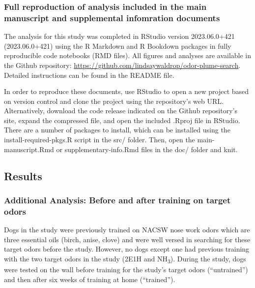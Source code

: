 \documentclass[
]{article}
\begin{document}
\hypertarget{full-reproduction-of-analysis-included-in-the-main-manuscript-and-supplemental-infomration-documents}{%
\subsubsection{Full reproduction of analysis included in the main manuscript and supplemental infomration documents}\label{full-reproduction-of-analysis-included-in-the-main-manuscript-and-supplemental-infomration-documents}}

The analysis for this study was completed in RStudio version 2023.06.0+421 (2023.06.0+421) using the R Markdown and R Bookdown packages in fully reproducible code notebooks (RMD files). All figures and analyses are available in the Github repository: \url{https://github.com/lindsaywaldrop/odor-plume-search}. Detailed instructions can be found in the README file.

In order to reproduce these documents, use RStudio to open a new project based on version control and clone the project using the repository's web URL. Alternatively, download the code release indicated on the Github repository's site, expand the compressed file, and open the included .Rproj file in RStudio. There are a number of packages to install, which can be installed using the install-required-pkgs.R script in the src/ folder. Then, open the main-manuscript.Rmd or supplementary-info.Rmd files in the doc/ folder and knit.

\hypertarget{results}{%
\subsection{Results}\label{results}}

\hypertarget{additional-analysis-before-and-after-training-on-target-odors}{%
\subsubsection{Additional Analysis: Before and after training on target odors}\label{additional-analysis-before-and-after-training-on-target-odors}}

Dogs in the study were previously trained on NACSW nose work odors which are three essential oils (birch, anise, clove) and were well versed in searching for these target odors before the study. However, no dogs except one had previous training with the two target odors in the study (2E1H and NH\textsubscript{3}). During the study, dogs were tested on the wall before training for the study's target odors (``untrained'') and then after six weeks of training at home (``trained'').
\end{document}
